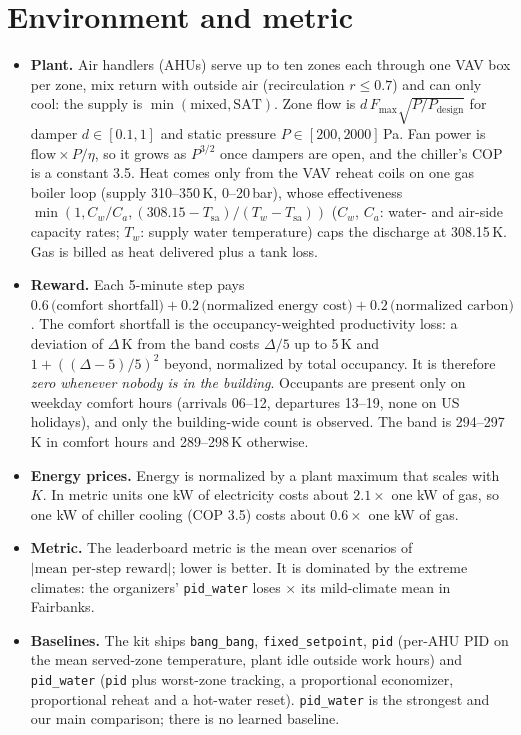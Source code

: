 \documentclass{article}
\begin{document}
\section{Environment and metric}
\label{sec:env}

\begin{itemize}
\item \textbf{Plant.} Air handlers (AHUs) serve up to ten zones each through one VAV box per zone, mix return with outside air (recirculation $r\le 0.7$) and can only cool: the supply is $\min(\text{mixed}, \text{SAT})$. Zone flow is $d\,F_{\max}\sqrt{P/P_{\text{design}}}$ for damper $d\in[0.1,1]$ and static pressure $P\in[200,2000]$\,Pa. Fan power is $\text{flow}\times P/\eta$, so it grows as $P^{3/2}$ once dampers are open, and the chiller's COP is a constant 3.5. Heat comes only from the VAV reheat coils on one gas boiler loop (supply 310--350\,K, 0--20\,bar), whose effectiveness $\min(1, C_w/C_a, (308.15-T_{\text{sa}})/(T_w - T_{\text{sa}}))$ ($C_w$, $C_a$: water- and air-side capacity rates; $T_w$: supply water temperature) caps the discharge at 308.15\,K. Gas is billed as heat delivered plus a tank loss.
\item \textbf{Reward.} Each 5-minute step pays $0.6\,\text{(comfort shortfall)} + 0.2\,\text{(normalized energy cost)} + 0.2\,\text{(normalized carbon)}$. The comfort shortfall is the occupancy-weighted productivity loss: a deviation of $\Delta$\,K from the band costs $\Delta/5$ up to 5\,K and $1+((\Delta-5)/5)^2$ beyond, normalized by total occupancy. It is therefore \emph{zero whenever nobody is in the building}. Occupants are present only on weekday comfort hours (arrivals 06--12, departures 13--19, none on US holidays), and only the building-wide count is observed. The band is 294--297\,K in comfort hours and 289--298\,K otherwise.
\item \textbf{Energy prices.} Energy is normalized by a plant maximum that scales with $K$. In metric units one kW of electricity costs about $2.1\times$ one kW of gas, so one kW of chiller cooling (COP 3.5) costs about $0.6\times$ one kW of gas.
\item \textbf{Metric.} The leaderboard metric is the mean over scenarios of $|\text{mean per-step reward}|$; lower is better. It is dominated by the extreme climates: the organizers' \texttt{pid\_water} loses \ExtremeRatioFairbanks$\times$ its mild-climate mean in Fairbanks.
\item \textbf{Baselines.} The kit ships \texttt{bang\_bang}, \texttt{fixed\_setpoint}, \texttt{pid} (per-AHU PID on the mean served-zone temperature, plant idle outside work hours) and \texttt{pid\_water} (\texttt{pid} plus worst-zone tracking, a proportional economizer, proportional reheat and a hot-water reset). \texttt{pid\_water} is the strongest and our main comparison; there is no learned baseline.
\end{itemize}
\end{document}
